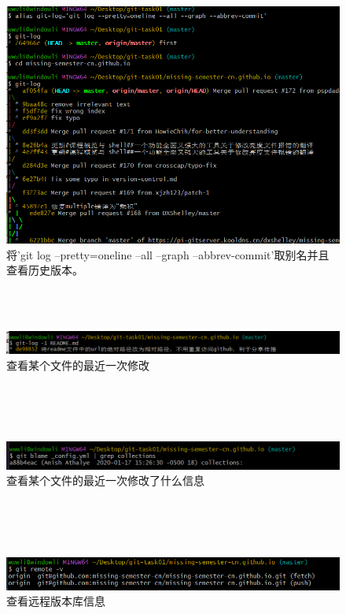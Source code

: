 \documentclass[a4paper, 12pt]{article}
\begin{document}
\\
\begin{figure}[H]
  \centering
  \includegraphics[width=1\textwidth]{屏幕截图 2024-08-28 164831.png}
  \caption{将'git log --pretty=oneline --all --graph --abbrev-commit'取别名并且查看历史版本。}
    \end{figure}
\\
 \\   
\begin{figure}[H]
  \centering
  \includegraphics[width=1\textwidth]{屏幕截图 2024-08-28 165007.png}
  \caption{查看某个文件的最近一次修改}
    \end{figure}
\\
\\
\\
\begin{figure}[H]
  \centering
  \includegraphics[width=1\textwidth]{屏幕截图 2024-08-28 165107.png}
  \caption{查看某个文件的最近一次修改了什么信息}
    \end{figure}
\\
  \\
  \\

\begin{figure}[H]
  \centering
  \includegraphics[width=1\textwidth]{屏幕截图 2024-08-28 192417.png}
  \caption{查看远程版本库信息}
    \end{figure}
\end{document}
